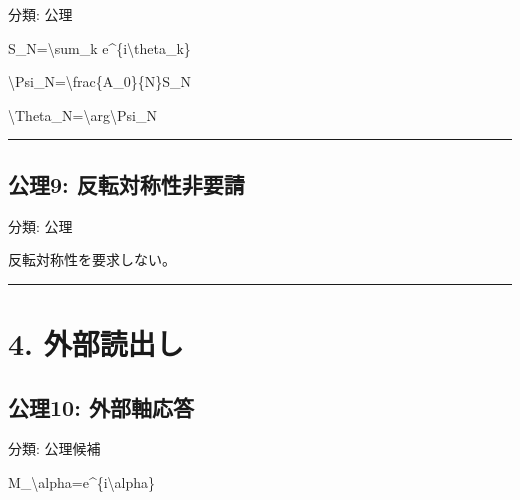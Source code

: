 \documentclass[
  a4paper,
]{ltjsarticle}
\newenvironment{Shaded}{}{}
\newcommand{\NormalTok}[1]{#1}
\begin{document}
分類: 公理

\begin{Shaded}
\begin{Highlighting}[]
\NormalTok{S\_N=\textbackslash{}sum\_k e\^{}\{i\textbackslash{}theta\_k\}}
\end{Highlighting}
\end{Shaded}

\begin{Shaded}
\begin{Highlighting}[]
\NormalTok{\textbackslash{}Psi\_N=\textbackslash{}frac\{A\_0\}\{N\}S\_N}
\end{Highlighting}
\end{Shaded}

\begin{Shaded}
\begin{Highlighting}[]
\NormalTok{\textbackslash{}Theta\_N=\textbackslash{}arg\textbackslash{}Psi\_N}
\end{Highlighting}
\end{Shaded}

\begin{center}\rule{0.5\linewidth}{0.5pt}\end{center}

\subsection{公理9:
反転対称性非要請}\label{ux516cux74069-ux53cdux8ee2ux5bfeux79f0ux6027ux975eux8981ux8acb}

分類: 公理

反転対称性を要求しない。

\begin{center}\rule{0.5\linewidth}{0.5pt}\end{center}

\section{4. 外部読出し}\label{ux5916ux90e8ux8aadux51faux3057}

\subsection{公理10:
外部軸応答}\label{ux516cux740610-ux5916ux90e8ux8ef8ux5fdcux7b54}

分類: 公理候補

\begin{Shaded}
\begin{Highlighting}[]
\NormalTok{M\_\textbackslash{}alpha=e\^{}\{i\textbackslash{}alpha\}}
\end{Highlighting}
\end{Shaded}
\end{document}
